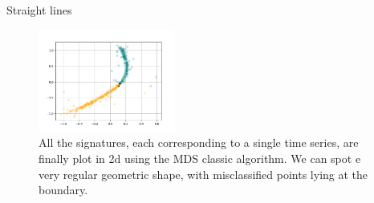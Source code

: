 \documentclass[twocolumn,9pt]{article}
\theoremstyle{definition}
\theoremstyle{remark}
\begin{document}
\begin{section}{Straight lines}
\begin{figure}[H]
\center
\includegraphics[width=0.40\textwidth]{proposed_plots/SEG-isometry-seed0.png}
\caption{
All the signatures, each corresponding to a single time series,
are finally plot in 2d using the MDS classic algorithm.
We can spot e very regular geometric shape, with misclassified points
lying at the boundary.
}
\end{figure}

\end{section} %
\end{document}
